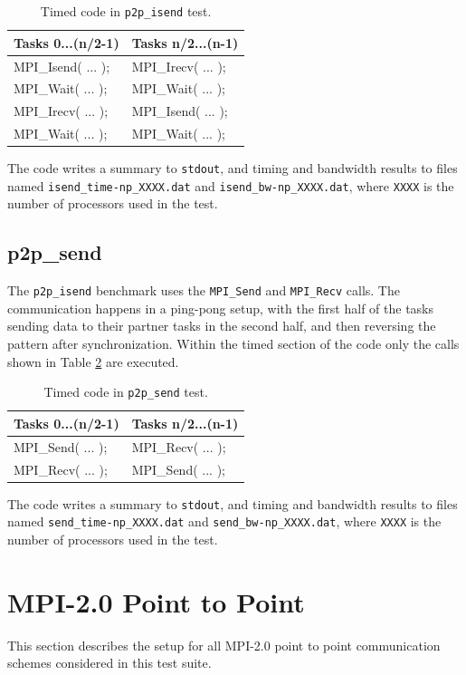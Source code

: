 \documentclass[10pt,a4paper]{report}
\begin{document}
\begin{table}[ht]
\centering
\caption{Timed code in \texttt{p2p\_isend} test.}
\label{tab:isend}
\begin{tabular}{|l|l|}
\hline
\bf{Tasks 0...(n/2-1)}	& \bf{Tasks n/2...(n-1)}\\\hline
MPI\_Isend( ... );      & MPI\_Irecv( ... );\\
MPI\_Wait( ... );       & MPI\_Wait( ... );\\
MPI\_Irecv( ... );      & MPI\_Isend( ... );\\
MPI\_Wait( ... );       & MPI\_Wait( ... );\\\hline
\end{tabular}
\end{table}

The code writes a summary to \verb+stdout+, and timing and bandwidth results to files named \verb+isend_time-np_XXXX.dat+ and \verb+isend_bw-np_XXXX.dat+, where \verb+XXXX+ is the number of processors used in the test.

\FloatBarrier
\subsection{p2p\_send}
The \verb+p2p_isend+ benchmark uses the \verb+MPI_Send+ and \verb+MPI_Recv+ calls. The communication happens in a ping-pong setup, with the first half of the tasks sending data to their partner tasks in the second half, and then reversing the pattern after synchronization. Within the timed section of the code only the calls shown in Table \ref{tab:send} are executed.

\begin{table}[ht]
\centering
\caption{Timed code in \texttt{p2p\_send} test.}
\label{tab:send}
\begin{tabular}{|l|l|}
\hline
\bf{Tasks 0...(n/2-1)}	& \bf{Tasks n/2...(n-1)}\\\hline
MPI\_Send( ... );       & MPI\_Recv( ... );\\
MPI\_Recv( ... );       & MPI\_Send( ... );\\\hline
\end{tabular}
\end{table}

The code writes a summary to \verb+stdout+, and timing and bandwidth results to files named \verb+send_time-np_XXXX.dat+ and \verb+send_bw-np_XXXX.dat+, where \verb+XXXX+ is the number of processors used in the test.

\FloatBarrier
\section{MPI-2.0 Point to Point}
This section describes the setup for all MPI-2.0 point to point communication schemes considered in this test suite.
\end{document}
